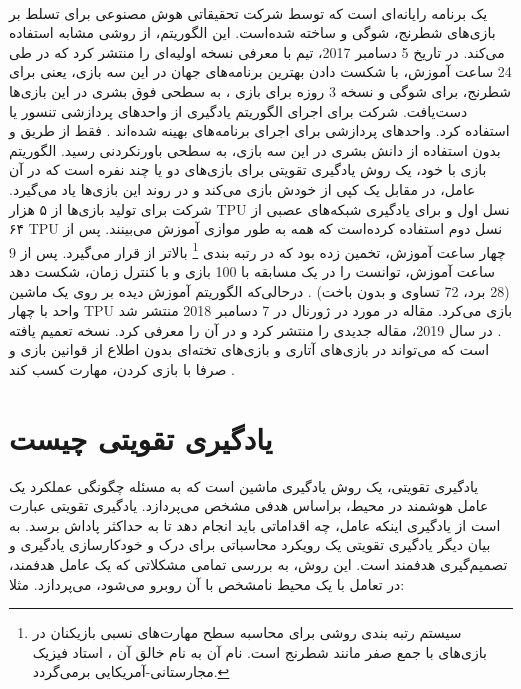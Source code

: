 \paragraph{}
یک برنامه رایانه‌ای است که توسط شرکت تحقیقاتی هوش مصنوعی
 برای تسلط بر بازی‌های شطرنج، شوگی و 
ساخته شده‌است. این الگوریتم، از روشی مشابه
  استفاده می‌کند. در تاریخ 5 دسامبر 2017،  تیم
  با معرفی
   نسخه اولیه‌ای را منتشر کرد که در طی 24 ساعت آموزش، با شکست دادن بهترین برنامه‌های جهان در این سه بازی، یعنی
    برای شطرنج،
برای شوگی و نسخه 3 روزه
برای بازی 
،
به سطحی فوق بشری در این بازی‌ها دست‌یافت.  شرکت 
برای اجرای الگوریتم یادگیری
از واحدهای پردازشی تنسور
یا 
استفاده کرد. واحدهای پردازشی  برای اجرای برنامه‌های
بهینه شده‌اند
\cite{silver2017}.
  فقط از طریق 
و بدون استفاده از دانش بشری در این سه بازی، به سطحی باورنکردنی رسید. الگوریتم بازی با خود، یک روش یادگیری تقویتی برای بازی‌های دو یا چند نفره است که در آن عامل، در مقابل یک کپی از خودش بازی می‌کند و در روند این بازی‌ها یاد می‌گیرد.
شرکت
  برای تولید  بازی‌ها از ۵ هزار TPU نسل اول و برای یادگیری شبکه‌های عصبی از ۶۴ TPU نسل دوم استفاده کرده‌است که همه به طور موازی آموزش می‌بینند.
پس از چهار ساعت آموزش،
  تخمین زده بود که
    در رتبه بندی
\footnote{سیستم رتبه بندی
	  روشی برای محاسبه سطح مهارت‌های نسبی بازیکنان در بازی‌های با جمع صفر مانند شطرنج است. نام آن به نام خالق آن
،
استاد فیزیک مجارستانی-آمریکایی برمی‌گردد.}
بالاتر از
  قرار می‌گیرد. پس از 9 ساعت آموزش، توانست
را در یک مسابقه با 100 بازی و با کنترل زمان، شکست دهد (28 برد، 72 تساوی و بدون باخت) 
\cite{silver2017, knapton2017entire, superhuman2017}.
درحالی‌که الگوریتم آموزش دیده 
بر روی یک ماشین واحد با چهار TPU بازی می‌کرد.
مقاله
  در مورد
    در ژورنال
در 7 دسامبر 2018 منتشر شد
\cite{silver2018general}.
در سال 2019،
مقاله جدیدی را منتشر کرد و در آن
را معرفی کرد. 
نسخه تعمیم یافته 
است که می‌تواند در بازی‌های آتاری و بازی‌های تخته‌ای
 بدون اطلاع از قوانین بازی و صرفا با بازی کردن، مهارت کسب کند
 \cite{alphazerowiki}.



\section{یادگیری تقویتی چیست}
یادگیری تقویتی، یک روش یادگیری ماشین است که  به مسئله چگونگی عملکرد یک عامل هوشمند  در محیط، براساس هدفی مشخص می‌پردازد. یادگیری تقویتی عبارت است از یادگیری اینکه عامل، چه اقداماتی باید انجام دهد تا به حداکثر پاداش برسد. به بیان دیگر یادگیری تقویتی یک رویکرد محاسباتی برای درک و خودکار‌سازی یادگیری و تصمیم‌گیری هدفمند است. این روش، به بررسی تمامی‌ مشکلاتی که یک عامل هدفمند، در تعامل با یک محیط نامشخص با آن روبرو می‌شود، می‌پردازد. مثلا:

